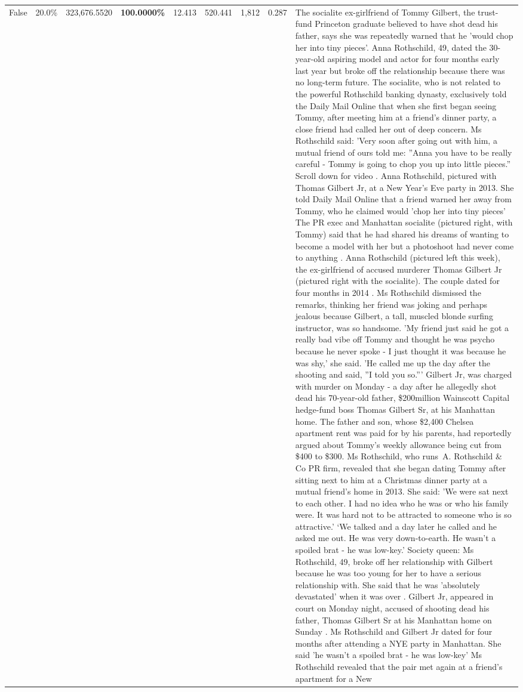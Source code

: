 \begin{table}[H]
\begin{tabular}{lllrlllll}
False & 20.0\% & 323,676.5520 & \bfseries \color{red} 100.0000\% & 12.413 & 520.441 & 1,812 & 0.287 & The socialite ex-girlfriend of Tommy Gilbert, the trust-fund Princeton graduate believed to have shot dead his father, says she was repeatedly warned that he 'would chop her into tiny pieces'. Anna Rothschild, 49, dated the 30-year-old aspiring model and actor for four months early last year but broke off the relationship because there was no long-term future. The socialite, who is not related to the powerful Rothschild banking dynasty, exclusively told the Daily Mail Online that when she first began seeing Tommy, after meeting him at a friend's dinner party, a close friend had called her out of deep concern. Ms Rothschild said: 'Very soon after going out with him, a mutual friend of ours told me: ''Anna you have to be really careful - Tommy is going to chop you up into little pieces.'' Scroll down for video . Anna Rothschild, pictured with Thomas Gilbert Jr, at a New Year's Eve party in 2013. She told Daily Mail Online that a friend warned her away from Tommy, who he claimed would 'chop her into tiny pieces' The PR exec and Manhattan socialite (pictured right, with Tommy) said that he had shared his dreams of wanting to become a model with her but a photoshoot had never come to anything . Anna Rothschild (pictured left this week), the ex-girlfriend of accused murderer Thomas Gilbert Jr (pictured right with the socialite). The couple dated for four months in 2014 . Ms Rothschild dismissed the remarks, thinking her friend was joking and perhaps jealous because Gilbert, a tall, muscled blonde surfing instructor, was so handsome. 'My friend just said he got a really bad vibe off Tommy and thought he was psycho because he never spoke - I just thought it was because he was shy,' she said. 'He called me up the day after the shooting and said, ''I told you so.''' Gilbert Jr, was charged with murder on Monday - a day after he allegedly shot dead his 70-year-old father, \$200million Wainscott Capital hedge-fund boss Thomas Gilbert Sr, at his Manhattan home. The father and son, whose \$2,400 Chelsea apartment rent was paid for by his parents, had reportedly argued about Tommy's weekly allowance being cut from \$400 to \$300. Ms Rothschild, who runs A. Rothschild \& Co PR firm, revealed that she began dating Tommy after sitting next to him at a Christmas dinner party at a mutual friend's home in 2013. She said: 'We were sat next to each other. I had no idea who he was or who his family were. It was hard not to be attracted to someone who is so attractive.' ‘We talked and a day later he called and he asked me out. He was very down-to-earth. He wasn’t a spoiled brat - he was low-key.’ Society queen: Ms Rothschild, 49, broke off her relationship with Gilbert because he was too young for her to have a serious relationship with. She said that he was 'absolutely devastated' when it was over . Gilbert Jr, appeared in court on Monday night, accused of shooting dead his father, Thomas Gilbert Sr at his Manhattan home on Sunday . Ms Rothschild and Gilbert Jr dated for four months after attending a NYE party in Manhattan. She said 'he wasn't a spoiled brat - he was low-key' Ms Rothschild revealed that the pair met again at a friend’s apartment for a New 
\end{tabular}
\end{table}
